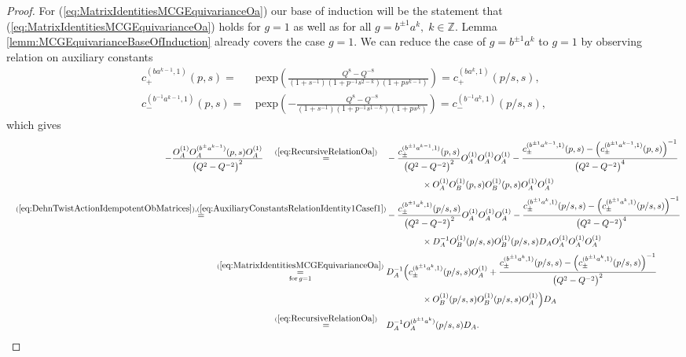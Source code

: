 \documentclass{amsart}
\begin{document}
\begin{proof}
For (\ref{eq:MatrixIdentitiesMCGEquivarianceOa}) our base of induction will be the statement that (\ref{eq:MatrixIdentitiesMCGEquivarianceOa}) holds for $g=1$ as well as for all $g=b^{\pm1}a^k,\;k\in\mathbb Z$. Lemma \ref{lemm:MCGEquivarianceBaseOfInduction} already covers the case $g=1$. We can reduce the case of $g=b^{\pm1}a^k$ to $g=1$ by observing relation on auxiliary constants
\begin{subequations}
\begin{align}
c_+^{(ba^{k-1},1)}(p,s)=&\,\mathrm{pexp}\left(\frac{Q^8-Q^{-8}}{(1+s^{-1})(1+p^{-1}s^{2-k})(1+ps^{k-1})}\right)=c_+^{(ba^k,1)}(p/s,s),\\
c_-^{(b^{-1}a^{k-1},1)}(p,s)=&\,\mathrm{pexp}\left(-\frac{Q^8-Q^{-8}}{(1+s^{-1})(1+p^{-1}s^{1-k})(1+ps^k)}\right)=c_-^{(b^{-1}a^k,1)}(p/s,s),
\end{align}
\label{eq:AuxiliaryConstantsRelationIdentity1Casef1}
\end{subequations}
which gives
\begin{align*}
-\frac{O_A^{(1)}O_A^{(b^{\pm}a^{k-1})}(p,s)O_A^{(1)}}{\big(Q^2-Q^{-2}\big)^2}\quad\overset{(\ref{eq:RecursiveRelationOa})}{=}\quad&-\frac{c_{\pm}^{(b^{\pm1}a^{k-1},1)}(p,s)}{\big(Q^2-Q^{-2}\big)^2}O_A^{(1)}O_A^{(1)}O_A^{(1)}-\frac{c_{\pm}^{(b^{\pm1}a^{k-1},1)}(p,s)-\left(c_{\pm}^{(b^{\pm1}a^{k-1},1)}(p,s)\right)^{-1}}{\big(Q^2-Q^{-2}\big)^4}\\[0.25em]
&\qquad\qquad\times O_A^{(1)}O_B^{(1)}(p,s)O_B^{(1)}(p,s)O_A^{(1)}O_A^{(1)}\\[0.25em]
\quad\overset{(\ref{eq:DehnTwistActionIdempotentObMatrices}),(\ref{eq:AuxiliaryConstantsRelationIdentity1Casef1})}{=}&-\frac{c_{\pm}^{(b^{\pm1}a^k,1)}(p/s,s)}{\big(Q^2-Q^{-2}\big)^2}O_A^{(1)}O_A^{(1)}O_A^{(1)}-\frac{c_{\pm}^{(b^{\pm1}a^k,1)}(p/s,s)-\left(c_{\pm}^{(b^{\pm1}a^k,1)}(p/s,s)\right)^{-1}}{\big(Q^2-Q^{-2}\big)^4}\\[0.25em]
&\qquad\qquad\times D_A^{-1}O_B^{(1)}(p/s,s)O_B^{(1)}(p/s,s)D_AO_A^{(1)}O_A^{(1)}O_A^{(1)}\\[0.25em]
\overset{(\ref{eq:MatrixIdentitiesMCGEquivarianceOa})}{\underset{\textrm{for}\,g=1}{=}}\;&D_A^{-1}\Big(c_{\pm}^{(b^{\pm1}a^k,1)}(p/s,s)O_A^{(1)}+\frac{c_{\pm}^{(b^{\pm1}a^k,1)}(p/s,s)-\left(c_{\pm}^{(b^{\pm1}a^k,1)}(p/s,s)\right)^{-1}}{\big(Q^2-Q^{-2}\big)^2}\\[0.25em]
&\qquad\qquad\times O_B^{(1)}(p/s,s)O_B^{(1)}(p/s,s)O_A^{(1)}\Big)D_A\\[0.25em]
\overset{(\ref{eq:RecursiveRelationOa})}{=}\quad&D_A^{-1}O_A^{(b^{\pm1}a^k)}(p/s,s)D_A.
\end{align*}


\end{proof}
\end{document}

